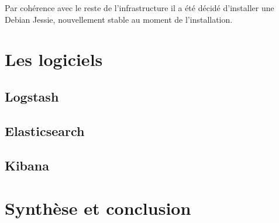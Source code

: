 \documentclass[a4paper,12pt,one side,titlepage]{report}
\begin{document}
Par cohérence avec le reste de l'infrastructure il a été décidé d'installer une 
Debian Jessie, nouvellement stable au moment de l'installation.
%
%
%
%

\part{Les logiciels}
\chapter{Logstash}


\chapter{Elasticsearch}


\chapter{Kibana}


\part{Synthèse et conclusion}

\end{document}
